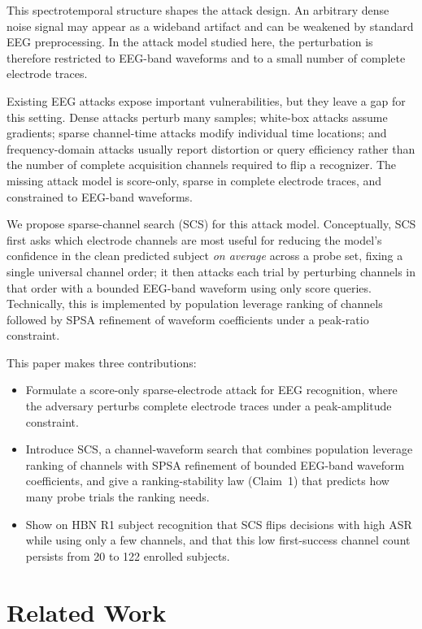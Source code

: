 \documentclass[journal]{IEEEtran}
\begin{document}
This spectrotemporal structure shapes the attack design. An arbitrary dense noise signal may appear as a wideband artifact and can be weakened by standard EEG preprocessing. In the attack model studied here, the perturbation is therefore restricted to EEG-band waveforms and to a small number of complete electrode traces.

Existing EEG attacks expose important vulnerabilities, but they leave a gap for this setting. Dense attacks perturb many samples; white-box attacks assume gradients; sparse channel-time attacks modify individual time locations; and frequency-domain attacks usually report distortion or query efficiency rather than the number of complete acquisition channels required to flip a recognizer. The missing attack model is score-only, sparse in complete electrode traces, and constrained to EEG-band waveforms.

We propose sparse-channel search (SCS) for this attack model. Conceptually, SCS first asks which electrode channels are most useful for reducing the model's confidence in the clean predicted subject \emph{on average} across a probe set, fixing a single universal channel order; it then attacks each trial by perturbing channels in that order with a bounded EEG-band waveform using only score queries. Technically, this is implemented by population leverage ranking of channels followed by SPSA refinement of waveform coefficients under a peak-ratio constraint.

This paper makes three contributions:
\begin{itemize}
    \item Formulate a score-only sparse-electrode attack for EEG recognition, where the adversary perturbs complete electrode traces under a peak-amplitude constraint.
    \item Introduce SCS, a channel-waveform search that combines population leverage ranking of channels with SPSA refinement of bounded EEG-band waveform coefficients, and give a ranking-stability law (Claim~1) that predicts how many probe trials the ranking needs.
    \item Show on HBN R1 subject recognition that SCS flips decisions with high ASR while using only a few channels, and that this low first-success channel count persists from 20 to 122 enrolled subjects.
\end{itemize}

\section{Related Work}
\end{document}
